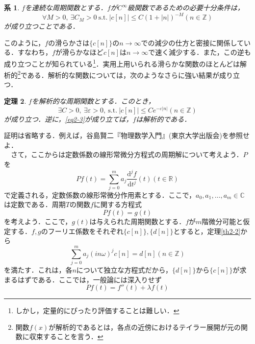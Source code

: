 \documentclass[a4j]{jsbook}
\newtheorem{theorem}{定理}
\newtheorem{cor}[theorem]{系}
\numberwithin{theorem}{chapter}  %
\begin{document}
\begin{cor}
\label{cor2-4}
\(f\)を連続な周期関数とする．\(f\)が\(C^\infty\)級関数であるための必要十分条件は，
\begin{equation*}
    \forall M>0,\ \exists C_M>0\ \mathrm{s.t.}\ |c[n]|\leq C\left(1+|n|\right)^{-M} (n\in\mathbb{Z})
\end{equation*}
が成り立つことである．
\end{cor}
このように，\(f\)の滑らかさは\(\{c[n]\}\)の\(n\to\infty\)での減少の仕方と密接に関係している．すなわち，\(f\)が滑らかなほど\(c[n]\)は\(n\to\infty\)で速く減少する．また，この逆も成り立つことが知られている\footnote{しかし，定量的にぴったり評価することは難しい．}．実用上用いられる滑らかな関数のほとんどは解析的\footnote{
関数\(f(x)\)が解析的であるとは，各点の近傍におけるテイラー展開が元の関数に収束することを言う．
}である．解析的な関数については，次のようなさらに強い結果が成り立つ．
\begin{theorem}
\label{th2-5}
\(f\)を解析的な周期関数とする．このとき，
\begin{equation}
    \exists C>0,\ \exists \varepsilon>0,\ \mathrm{s.t.}\ |c[n]|\leq Ce^{-\varepsilon|n|} (n\in\mathbb{Z}) \label{eq2-3}
\end{equation}
が成り立つ．逆に，\eqref{eq2-3}が成り立てば，\(f\)は解析的である．
\end{theorem}
証明は省略する．例えば，谷島賢二『物理数学入門』(東京大学出版会)を参照せよ．\\
　さて，ここからは定数係数の線形常微分方程式の周期解について考えよう．\(P\)を
\begin{equation*}
    Pf(t)=\sum_{j=0}^m a_j\frac{\mathrm{d}^j f}{\mathrm{d}t^j}(t) (t\in\mathbb{R})
\end{equation*}
で定義される，定数係数の線形常微分作用素とする．ここで，\(a_0, a_1, \dots, a_m\in\mathbb{C}\)は定数である．周期\(T\)の関数\(f\)に関する方程式
\begin{equation*}
    Pf(t)=g(t)
\end{equation*}
を考えよう．ここで，\(g(t)\)は与えられた周期関数とする．\(f\)が\(m\)階微分可能と仮定する．\(f, g\)のフーリエ係数をそれぞれ\(\{c[n]\}, \{d[n]\}\)とすると，定理\ref{th2-2}から
\begin{equation*}
    \sum_{j=0}^m a_j(in\omega)^j c[n]=d[n] (n\in\mathbb{Z})
\end{equation*}
を満たす．これは，各\(n\)について独立な方程式だから，\(\{d[n]\}\)から\(\{c[n]\}\)が求まるはずである．ここでは，一般論には深入りせず
\begin{equation*}
    Pf(t)=f''(t)+\lambda f(t)
\end{equation*}
\end{document}
